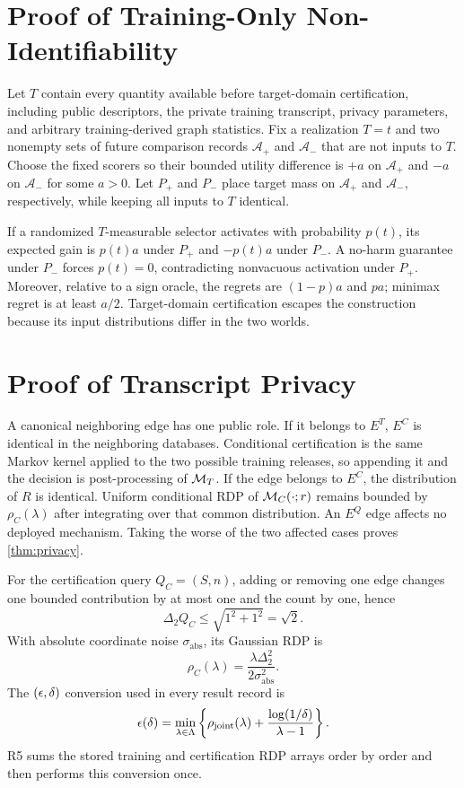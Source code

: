 \section{Proof of Training-Only Non-Identifiability}
\label{app:nonidentifiability}

Let $T$ contain every quantity available before target-domain certification,
including public descriptors, the private training transcript, privacy
parameters, and arbitrary training-derived graph statistics. Fix a realization
$T=t$ and two nonempty sets of future comparison records $\mathcal A_+$ and
$\mathcal A_-$ that are not inputs to $T$. Choose the fixed scorers so their
bounded utility difference is $+a$ on $\mathcal A_+$ and $-a$ on
$\mathcal A_-$ for some $a>0$. Let $P_+$ and $P_-$ place target mass on
$\mathcal A_+$ and $\mathcal A_-$, respectively, while keeping all inputs to
$T$ identical.

If a randomized $T$-measurable selector activates with probability $p(t)$,
its expected gain is $p(t)a$ under $P_+$ and $-p(t)a$ under $P_-$. A no-harm
guarantee under $P_-$ forces $p(t)=0$, contradicting nonvacuous activation
under $P_+$. Moreover, relative to a sign oracle, the regrets are
$(1-p)a$ and $pa$; minimax regret is at least $a/2$. Target-domain
certification escapes the construction because its input distributions differ
in the two worlds.

\section{Proof of Transcript Privacy}
\label{app:privacy}

A canonical neighboring edge has one public role. If it belongs to $E^T$,
$E^C$ is identical in the neighboring databases. Conditional certification is
the same Markov kernel applied to the two possible training releases, so
appending it and the decision is post-processing of $\mathcal{M}_T$. If the edge
belongs to $E^C$, the distribution of $R$ is identical. Uniform conditional
RDP of $\mathcal{M}_C(\cdot;r)$ remains bounded by $\rho_C(\lambda)$ after integrating
over that common distribution. An $E^Q$ edge affects no deployed mechanism.
Taking the worse of the two affected cases proves \cref{thm:privacy}.

For the certification query $Q_C=(S,n)$, adding or removing one edge changes
one bounded contribution by at most one and the count by one, hence
\begin{equation}
 \Delta_2 Q_C\leq\sqrt{1^2+1^2}=\sqrt2.
\end{equation}
With absolute coordinate noise $\sigma_{\mathrm{abs}}$, its Gaussian RDP is
\begin{equation}
 \rho_C(\lambda)
 =\frac{\lambda\Delta_2^2}{2\sigma_{\mathrm{abs}}^2}.
\end{equation}
The $(\epsilon,\delta)$ conversion used in every result record is
\begin{equation}
 \epsilon(\delta)=
 \min_{\lambda\in\Lambda}
 \left\{\rho_{\mathrm{joint}}(\lambda)
       +\frac{\log(1/\delta)}{\lambda-1}\right\}.
\end{equation}
R5 sums the stored training and certification RDP arrays order by order and
then performs this conversion once.

